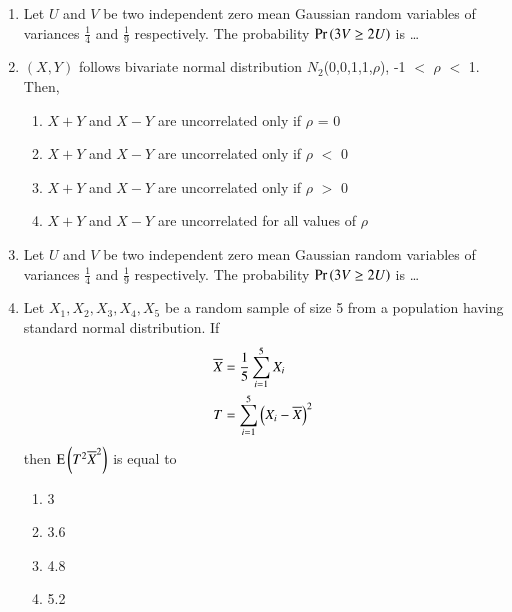 \renewcommand{\theequation}{\theenumi}
\renewcommand{\thefigure}{\theenumi}
\renewcommand{\thetable}{\theenumi}
\begin{enumerate}[label=\thesection.\arabic*.,ref=\thesection.\theenumi]

\item Let $U$ and $V$ be two independent zero mean Gaussian random variables of variances $\frac{1}{4}$ and $\frac{1}{9}$ respectively. The probability $\Pr\left(3V \geq 2U\right)$ is \dots
\\
\solution

%
\item $(X,Y)$ follows bivariate normal distribution $N_2$(0,0,1,1,$\rho$),  -1 $<$ $\rho$ $<$ 1. Then,
\begin{enumerate}
    \item $X+Y$ and $X-Y$ are uncorrelated only if $\rho$ = 0
    \item $X+Y$ and $X-Y$ are uncorrelated only if $\rho$ $<$ 0
    \item $X+Y$ and $X-Y$ are uncorrelated only if $\rho$ $>$ 0
    \item $X+Y$ and $X-Y$ are uncorrelated for all values of $\rho$
\end{enumerate}
\solution

%
\item Let $U$ and $V$ be two independent zero mean Gaussian random variables of variances $\frac{1}{4}$ and $\frac{1}{9}$ respectively. The probability $\Pr\left(3V \geq 2U\right)$ is \dots
\\
\solution

%
\item Let $X_1,X_2,X_3,X_4,X_5$ be a random sample of size 5 from a population having standard normal distribution. If 
\begin{align}
    \label{gauss/3/mean}
    \overline{X}&=\frac{1}{5}\sum_{i=1}^5 X_i
    \\
    T &=\sum_{i=1}^5\left(X_i-\overline{X}\right)^2
    \label{gauss/3/var}
\end{align}
%
then $\text{E}\left( T^2\overline{X}^2 \right)$ is equal to 
\begin{enumerate}
    \item 3
    \item 3.6
    \item 4.8
    \item 5.2
\end{enumerate} 
\solution



\end{enumerate}

